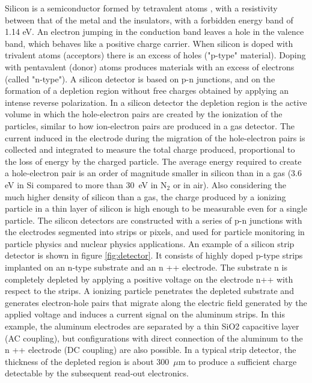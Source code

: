 \noindent Silicon is a semiconductor formed by tetravalent atoms \cite{detector}, with a resistivity between that of the metal and the insulators, with a forbidden energy band of 1.14 eV.
An electron jumping in the conduction band leaves a hole in the valence band, which behaves like a positive charge carrier.
When silicon is doped with trivalent atoms (acceptors) there is an excess of holes ("p-type" material).
Doping with pentavalent (donor) atoms produces materials with an excess of electrons (called "n-type").
\newline
A silicon detector is based on p-n junctions, and on the formation of a depletion region without free charges obtained by applying an intense reverse polarization.
In a silicon detector the depletion region is the active volume in which the hole-electron pairs are created by the ionization of the particles, similar to how ion-electron pairs are produced in a gas detector.
The current induced in the electrode during the migration of the hole-electron pairs is collected and integrated to measure the total charge produced, proportional to the loss of energy by the charged particle.
\newline
The average energy required to create a hole-electron pair is an order of magnitude smaller in silicon than in a gas (3.6 eV in Si compared to more than 30~eV in N$_2$ or in air).
Also considering the much higher density of silicon than a gas, the charge produced by a ionizing particle in a thin layer of silicon is high enough to be measurable even for a single particle.
\newline
The silicon detectors are constructed with a series of p-n junctions with the electrodes segmented into strips or pixels, and used for particle monitoring in particle physics and nuclear physics applications.
An example of a silicon strip detector is shown in figure \ref{fig:detector}. It consists of highly doped p-type strips implanted on an n-type substrate and an n ++ electrode.
The substrate n is completely depleted by applying a positive voltage on the electrode n++ with respect to the strips.
A ionizing particle penetrates the depleted substrate and generates electron-hole pairs that migrate along the electric field generated by the applied voltage and induces a current signal on the aluminum strips.
In this example, the aluminum electrodes are separated by a thin SiO2 capacitive layer (AC coupling), but configurations with direct connection of the aluminum to the n ++ electrode (DC coupling) are also possible.
In a typical strip detector, the thickness of the depleted region is about 300~$\mu$m to produce a sufficient charge detectable by the subsequent read-out electronics. 
